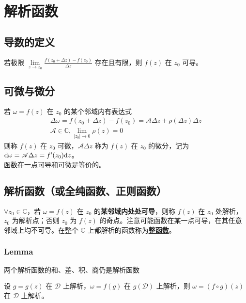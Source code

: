 \documentclass[./main.tex]{subfiles}
\begin{document}
\section{解析函数}
\subsection{导数的定义}
若极限 $\lim\limits_{z\rightarrow z_0}\frac{f(z_0+\Delta z)-f(z_0)}{\Delta z}$ 存在且有限，则 $f(z)$ 在 $z_0$ 可导。
\subsection{可微与微分}
若 $\omega=f(z)$ 在 $z_0$ 的某个邻域内有表达式
\begin{gather}
    \Delta\omega=f(z_0+\Delta z)-f(z_0)=\mathscr{A}\Delta z+\rho(\Delta z)\Delta z\\
    \mathscr{A}\in\mathbb{C},\lim\limits_{|z_0|\rightarrow 0}\rho(z)=0
\end{gather}
则称 $f(z)$ 在 $z_0$ 可微，$\mathscr{A}\Delta z$ 称为 $f(z)$ 在 $z_0$ 的微分，记为 $\text{d}\omega=\mathscr{A}\Delta z=f'(z_0)\text{d}z$。\\
\indent 函数在一点可导和可微是等价的。
\subsection{解析函数（或全纯函数、正则函数）}
$\forall z_0\in\mathbb{C}$，若 $\omega=f(z)$ 在 $z_0$ 的\textbf{某邻域内处处可导}，则称 $f(z)$ 在 $z_0$ 处解析，$z_0$ 为解析点；否则 $z_0$ 为 $f(z)$ 的奇点。注意可能函数在某一点可导，在其任意邻域上均不可导。在整个 $\mathbb{C}$ 上都解析的函数称为\underline{\textbf{整函数}}。
\subsubsection{Lemma}
\begin{enumerate*}
    \item 两个解析函数的和、差、积、商仍是解析函数
    \item 设 $g=g(z)$ 在 $\mathscr{D}$ 上解析，$\omega=f(g)$ 在 $g(\mathscr{D})$ 上解析，则 $\omega=(f\circ g)(z)$ 在 $\mathscr{D}$ 上解析。
\end{enumerate*}
\end{document}
